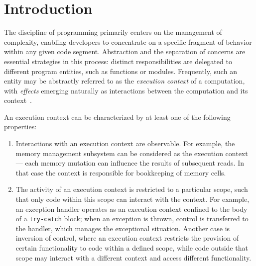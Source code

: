 \documentclass[acmsmall,review,screen]{acmart}
\begin{document}



\maketitle


\section{Introduction} \label{sec:intro}


The discipline of programming primarily centers on the management of complexity, enabling developers to concentrate on a specific fragment of behavior within any given code segment.
Abstraction and the separation of concerns are essential strategies in this process: distinct responsibilities are delegated to different program entities, such as functions or modules.
Frequently, such an entity may be abstractly referred to as the \textit{execution context} of a computation, with \textit{effects} emerging naturally as interactions between the computation and its context~\cite{kiselyov2013extensible}.

An execution context can be characterized by at least one of the following properties:
\begin{enumerate}
    \item Interactions with an execution context are observable.
    For example, the memory management subsystem can be considered as the execution context --- each memory mutation can influence the results of subsequent reads.
    In that case the context is responsible for bookkeeping of memory cells.
    \item The activity of an execution context is restricted to a particular scope, such that only code within this scope can interact with the context.
    For example, an exception handler operates as an execution context confined to the body of a \texttt{try-catch} block; when an exception is thrown, control is transferred to the handler, which manages the exceptional situation.
    Another case is inversion of control, where an execution context restricts the provision of certain functionality to code within a defined scope, while code outside that scope may interact with a different context and access different functionality.
\end{enumerate}
\end{document}
